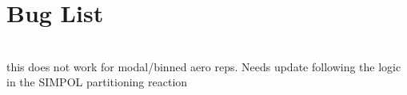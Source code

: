 \chapter{Bug List}
\hypertarget{bug}{}\label{bug}

\begin{DoxyRefList}
\item[Member \doxylink{rxn___h_l__phase__transfer_8c_aa82a07e921e3d22fda1d52073b16219d}{rxn\+\_\+\+HL\+\_\+phase\+\_\+transfer\+\_\+calc\+\_\+deriv\+\_\+contrib} (\doxylink{struct_model_data}{Model\+Data} \texorpdfstring{$\ast$}{*}model\+\_\+data, \doxylink{struct_time_derivative}{Time\+Derivative} time\+\_\+deriv, int \texorpdfstring{$\ast$}{*}rxn\+\_\+int\+\_\+data, double \texorpdfstring{$\ast$}{*}rxn\+\_\+float\+\_\+data, double \texorpdfstring{$\ast$}{*}rxn\+\_\+env\+\_\+data, realtype time\+\_\+step)]\hfill \\
\label{bug__bug000001}%
%
this does not work for modal/binned aero reps. Needs update following the logic in the SIMPOL partitioning reaction
\end{DoxyRefList}